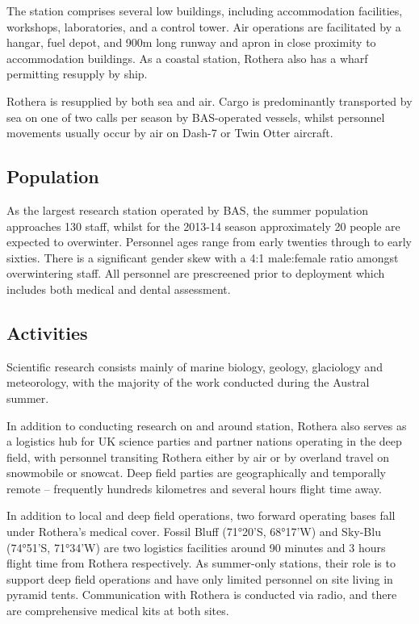 \documentclass[12pt,a4paper]{article}
\begin{document}
The station comprises several low buildings, including accommodation facilities, workshops, laboratories, and a control tower. Air operations are facilitated by a hangar, fuel depot, and 900m long runway and apron in close proximity to accommodation buildings. As a coastal station, Rothera also has a wharf permitting resupply by ship.

Rothera is resupplied by both sea and air. Cargo is predominantly transported by sea on one of two calls per season by BAS-operated vessels, whilst personnel movements usually occur by air on Dash-7 or Twin Otter aircraft.

\subsection{Population}

As the largest research station operated by BAS, the summer population approaches 130 staff, whilst for the 2013-14 season approximately 20 people are expected to overwinter. Personnel ages range from early twenties through to early sixties. There is a significant gender skew with a 4:1 male:female ratio amongst overwintering staff. All personnel are prescreened prior to deployment which includes both medical and dental assessment.

\subsection{Activities}

 Scientific research consists mainly of marine biology, geology, glaciology and meteorology, with the majority of the work conducted during the Austral summer.

In addition to conducting research on and around station, Rothera also serves as a logistics hub for UK science parties and partner nations operating in the deep field, with personnel transiting Rothera either by air or by overland travel on snowmobile or snowcat. Deep field parties are geographically and temporally remote -- frequently hundreds kilometres and several hours flight time away.

In addition to local and deep field operations, two forward operating bases fall under Rothera's medical cover. Fossil Bluff (71°20'S, 68°17'W) and Sky-Blu (74°51'S, 71°34'W) are two logistics facilities around 90 minutes and 3 hours flight time from Rothera respectively. As summer-only stations, their role is to support deep field operations and have only limited personnel on site living in pyramid tents. Communication with Rothera is conducted via radio, and there are comprehensive medical kits at both sites.
\end{document}
